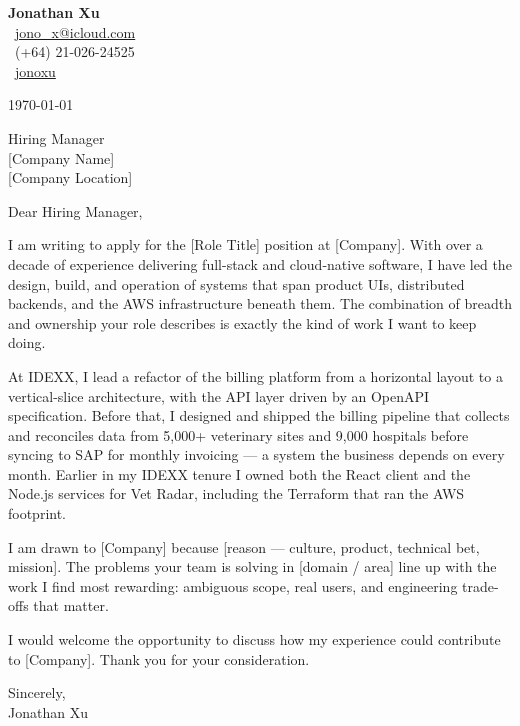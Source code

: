 \documentclass[11pt,a4paper]{article}
\begin{document}
\begin{flushright}
{\Large\textbf{Jonathan Xu}}\\[0.3em]
\faEnvelope\ \href{mailto:jono_x@icloud.com}{jono\_x@icloud.com} \\
\faPhone\ (+64) 21-026-24525 \\
\faLinkedin\ \href{https://www.linkedin.com/in/jonathan-x-4aba55115}{jonoxu}
\end{flushright}

\vspace{0.5em}

\today

\vspace{0.5em}

Hiring Manager \\
{[Company Name]} \\
{[Company Location]}

\vspace{0.5em}

Dear Hiring Manager,

I am writing to apply for the [Role Title] position at [Company]. With over a decade of experience delivering full-stack and cloud-native software, I have led the design, build, and operation of systems that span product UIs, distributed backends, and the AWS infrastructure beneath them. The combination of breadth and ownership your role describes is exactly the kind of work I want to keep doing.

At IDEXX, I lead a refactor of the billing platform from a horizontal layout to a vertical-slice architecture, with the API layer driven by an OpenAPI specification. Before that, I designed and shipped the billing pipeline that collects and reconciles data from 5,000+ veterinary sites and 9,000 hospitals before syncing to SAP for monthly invoicing — a system the business depends on every month. Earlier in my IDEXX tenure I owned both the React client and the Node.js services for Vet Radar, including the Terraform that ran the AWS footprint.

I am drawn to [Company] because [reason — culture, product, technical bet, mission]. The problems your team is solving in [domain / area] line up with the work I find most rewarding: ambiguous scope, real users, and engineering trade-offs that matter.

I would welcome the opportunity to discuss how my experience could contribute to [Company]. Thank you for your consideration.

\vspace{0.5em}

Sincerely, \\
Jonathan Xu
\end{document}
